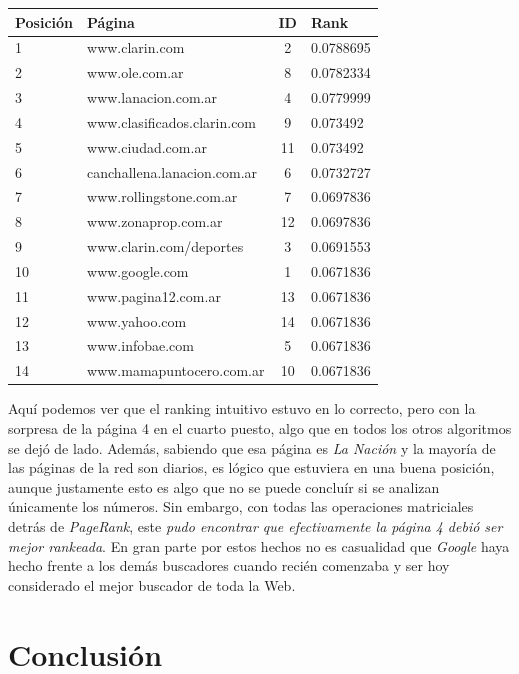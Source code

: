 \begin{center}
    \begin{tabular}{| l | l | c | l|}
    \hline
    Posición & Página & ID & Rank  \\ \hline
    
	1 & www.clarin.com & 2 & 0.0788695 \\ \hline
	2 & www.ole.com.ar & 8 & 0.0782334 \\ \hline
	3 & www.lanacion.com.ar & 4 & 0.0779999 \\ \hline
	4 & www.clasificados.clarin.com & 9 & 0.073492 \\ \hline
	5 & www.ciudad.com.ar & 11 & 0.073492 \\ \hline
	6 & canchallena.lanacion.com.ar & 6 & 0.0732727 \\ \hline
	7 & www.rollingstone.com.ar & 7 & 0.0697836 \\ \hline
	8 & www.zonaprop.com.ar & 12 & 0.0697836 \\ \hline
	9 & www.clarin.com/deportes & 3 & 0.0691553 \\ \hline
	10 & www.google.com & 1 & 0.0671836  \\ \hline
	11 & www.pagina12.com.ar & 13 & 0.0671836	\\ \hline		
	12 & www.yahoo.com & 14 & 0.0671836 \\ \hline
	13 & www.infobae.com & 5 & 0.0671836 \\ \hline
	14 & www.mamapuntocero.com.ar & 10 & 0.0671836 \\ \hline   
    \end{tabular}
\end{center}

Aquí podemos ver que el ranking intuitivo estuvo en lo correcto, pero con la sorpresa de la página 4 en el cuarto puesto, algo que en todos los otros algoritmos se dejó de lado. Además, sabiendo que esa página es \textit{La Nación} y la mayoría de las páginas de la red son diarios, es lógico que estuviera en una buena posición, aunque justamente esto es algo que no se puede concluír si se analizan únicamente los números. Sin embargo, con todas las operaciones matriciales detrás de \textit{PageRank}, este \textit{pudo encontrar que efectivamente la página 4 debió ser mejor rankeada}. En gran parte por estos hechos no es casualidad que \textit{Google} haya hecho frente a los demás buscadores cuando recién comenzaba y ser hoy considerado el mejor buscador de toda la Web. 
	
\section{Conclusión}


